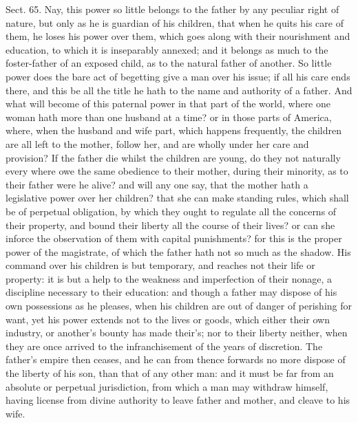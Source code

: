 \documentclass[11pt,openany]{book}
\begin{document}
Sect. 65. Nay, this power so little belongs to the father by any peculiar right of nature, but only as he is guardian of his children, that when he quits his care of them, he loses his power over them, which goes along with their nourishment and education, to which it is inseparably annexed; and it belongs as much to the foster-father of an exposed child, as to the natural father of another. So little power does the bare act of begetting give a man over his issue; if all his care ends there, and this be all the title he hath to the name and authority of a father. And what will become of this paternal power in that part of the world, where one woman hath more than one husband at a time? or in those parts of America, where, when the husband and wife part, which happens frequently, the children are all left to the mother, follow her, and are wholly under her care and provision? If the father die whilst the children are young, do they not naturally every where owe the same obedience to their mother, during their minority, as to their father were he alive? and will any one say, that the mother hath a legislative power over her children? that she can make standing rules, which shall be of perpetual obligation, by which they ought to regulate all the concerns of their property, and bound their liberty all the course of their lives? or can she inforce the observation of them with capital punishments? for this is the proper power of the magistrate, of which the father hath not so much as the shadow. His command over his children is but temporary, and reaches not their life or property: it is but a help to the weakness and imperfection of their nonage, a discipline necessary to their education: and though a father may dispose of his own possessions as he pleases, when his children are out of danger of perishing for want, yet his power extends not to the lives or goods, which either their own industry, or another's bounty has made their's; nor to their liberty neither, when they are once arrived to the infranchisement of the years of discretion. The father's empire then ceases, and he can from thence forwards no more dispose of the liberty of his son, than that of any other man: and it must be far from an absolute or perpetual jurisdiction, from which a man may withdraw himself, having license from divine authority to leave father and mother, and cleave to his wife.
\end{document}
